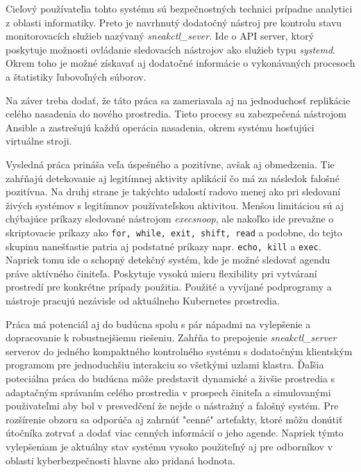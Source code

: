 Cieľový používateľia tohto systému sú bezpečnostných technici prípadne analytici z oblasti informatiky. Preto je navrhnutý dodatočný nástroj pre kontrolu stavu monitorovacích služieb nazývaný \textit{sneakctl\_sever}. Ide o API server, ktorý poskytuje možnosti ovládanie sledovacích nástrojov ako služieb typu \textit{systemd}. Okrem toho je možné získavať aj dodatočné informácie o vykonávaných procesoch a štatistiky ľubovoľných súborov.

Na záver treba dodať, že táto práca sa zameriavala aj na jednoduchosť replikácie celého nasadenia do nového prostredia. Tieto procesy su zabezpečená nástrojom Ansible a zastrešujú každú operácia nasadenia, okrem systému hosťujúci virtuálne stroji.

Vysledná práca prináša veľa úspešného a pozitívne, avšak aj obmedzenia. Tie zahŕňajú detekovanie aj legitímnej aktivity aplikácií čo má za následok falošné pozitívna. Na druhj strane je takýchto udalostí radovo menej ako pri sledovaní živých systémov s legitímnov používateľskou aktivitou. Menšou limitáciou sú aj chýbajúce príkazy sledované nástrojom \textit{execsnoop}, ale nakoľko ide prevažne o skriptovacie príkazy ako \texttt{for, while, exit, shift, read} a podobne, do tejto skupinu nanešťastie patria aj podstatné príkazy napr. \texttt{echo, kill} a \texttt{exec}. Napriek tomu ide o schopný detekčný systém, kde je možné sledovať agendu práve aktívného činiteľa. Poskytuje vysokú mieru flexibility pri vytváraní prostredí pre konkrétne prípady použitia. Použité a vyvíjané podprogramy a nástroje pracujú nezávisle od aktuálneho Kubernetes prostredia.

Práca má potenciál aj do budúcna spolu s pár nápadmi na vylepšenie a dopracovanie k robustnejšiemu riešeniu. Zahŕňa to prepojenie \textit{sneakctl\_server} serverov do jedného kompaktného kontrolného systému s dodatočným klientským programom pre jednoduchšiu interakciu so všetkými uzlami klastra. Ďaľšia poteciálna práca do budúcna môže predstavit dynamické a živšie prostredia s adaptačným správaním celého prostredia v prospech činiteľa a simulovanými použivateľmi aby bol v presvedčení že nejde o nástražný a falošný systém. Pre rozšírenie obzoru sa odporúča aj zahrnúť "cenné" artefakty, ktoré môžu donútiť útočníka zotrvať a dodať viac cenných informácií o jeho agende. Napriek týmto vylepšeniam je aktuálny stav systému vysoko použiteľný aj pre odborníkov v oblasti kyberbezpečnosti hlavne ako pridaná hodnota.